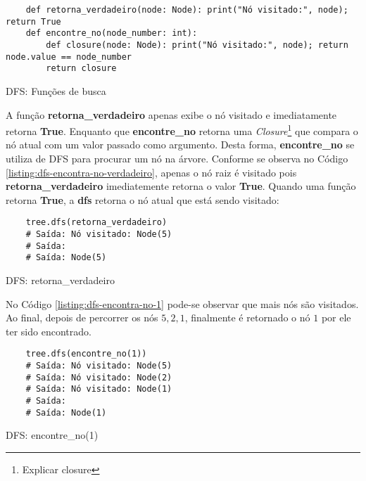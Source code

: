 \begin{listing}[H]
    \begin{verbatim}
    def retorna_verdadeiro(node: Node): print("Nó visitado:", node); return True
    def encontre_no(node_number: int):
        def closure(node: Node): print("Nó visitado:", node); return node.value == node_number
        return closure
    \end{verbatim}
    \caption{DFS: Funções de busca}
    \label{listing:dfs-encontra-no-funcoes}
\end{listing}
A função \textbf{retorna\_verdadeiro} apenas exibe o nó visitado e imediatamente retorna \textbf{True}. Enquanto que \textbf{encontre\_no}
retorna uma \textit{Closure}\footnote{
    Explicar closure
}
que compara o nó atual com um valor passado como argumento. Desta forma, \textbf{encontre\_no} se utiliza de DFS para procurar um nó na árvore.\linebreak
Conforme se observa no Código \ref{listing:dfs-encontra-no-verdadeiro}, apenas o nó raiz é visitado pois \textbf{retorna\_verdadeiro} imediatemente retorna
o valor \textbf{True}. Quando uma função retorna \textbf{True}, a \textbf{dfs} retorna o nó atual que está sendo visitado:

\begin{listing}[H]
    \begin{verbatim}
    tree.dfs(retorna_verdadeiro)
    # Saída: Nó visitado: Node(5)
    # Saída: 
    # Saída: Node(5)
    \end{verbatim}
    \caption{DFS: retorna\_verdadeiro}
    \label{listing:dfs-encontra-no-verdadeiro}
\end{listing}

No Código \ref{listing:dfs-encontra-no-1} pode-se observar que mais nós são visitados. Ao final, depois de percorrer
os nós $5,2,1$, finalmente é retornado o nó $1$ por ele ter sido encontrado.

\begin{listing}[H]
    \begin{verbatim}
    tree.dfs(encontre_no(1))
    # Saída: Nó visitado: Node(5)
    # Saída: Nó visitado: Node(2)
    # Saída: Nó visitado: Node(1)
    # Saída: 
    # Saída: Node(1)
    \end{verbatim}
    \caption{DFS: encontre\_no(1)}
    \label{listing:dfs-encontra-no-1}
\end{listing}


